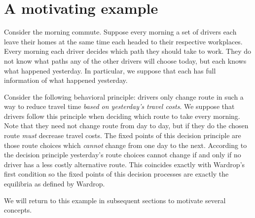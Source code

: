\section{A motivating example}\label{sec:motivating-example}

Consider the morning commute.
Suppose every morning a set of drivers each leave their homes at the same time each headed to their respective workplaces.
Every morning each driver decides which path they should take to work.
They do not know what paths any of the other drivers will choose today, but each knows what happened yesterday.
In particular, we suppose that each has full information of what happened yesterday. 

Consider the following behavioral principle: drivers only change route in such a way to reduce travel time \textit{based on yesterday's travel costs}.
We suppose that drivers follow this principle when deciding which route to take every morning.
Note that they need not change route from day to day, but if they do the chosen route \textit{must} decrease travel costs.
The fixed points of this decision principle are those route choices which \textit{cannot} change from one day to the next.
According to the decision principle yesterday's route choices cannot change if and only if no driver has a less costly alternative route.
This coincides exactly with Wardrop's first condition so the fixed points of this decision processes are exactly the equilibria as defined by Wardrop.

We will return to this example in subsequent sections to motivate several concepts.